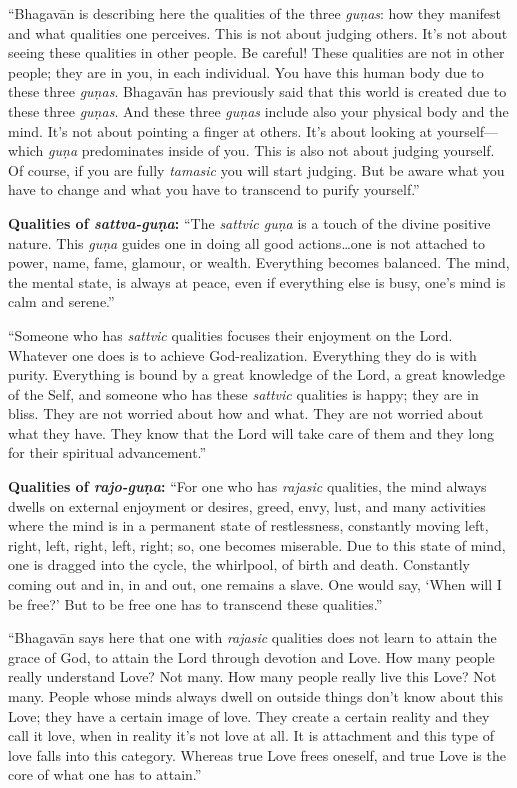 \enquote{Bhagavān is describing here the qualities of the three \textit{guṇas}: how they manifest and what qualities one perceives. This is not about judging others. It’s not about seeing these qualities in other people. Be careful! These qualities are not in other people; they are in you, in each individual. You have this human body due to these three \textit{guṇas}. Bhagavān has previously said that this world is created due to these three \textit{guṇas}. And these three \textit{guṇas} include also your physical body and the mind. It’s not about pointing a finger at others. It’s about looking at yourself---which \textit{guṇa} predominates inside of you. This is also not about judging yourself. Of course, if you are fully \textit{tamasic} you will start judging. But be aware what you have to change and what you have to transcend to purify yourself.}

\textbf{Qualities of \textit{sattva-guṇa}:} \enquote{The \textit{sattvic guṇa} is a touch of the divine positive nature. This \textit{guṇa} guides one in doing all good actions\ldots one is not attached to power, name, fame, glamour, or wealth. Everything becomes balanced. The mind, the mental state, is always at peace, even if everything else is busy, one’s mind is calm and serene.}

\enquote{Someone who has \textit{sattvic} qualities focuses their enjoyment on the Lord. Whatever one does is to achieve God-realization. Everything they do is with purity. Everything is bound by a great knowledge of the Lord, a great knowledge of the Self, and someone who has these \textit{sattvic} qualities is happy; they are in bliss. They are not worried about how and what. They are not worried about what they have. They know that the Lord will take care of them and they long for their spiritual advancement.}

\textbf{Qualities of \textit{rajo-guṇa}:} \enquote{For one who has \textit{rajasic} qualities, the mind always dwells on external enjoyment or desires, greed, envy, lust, and many activities where the mind is in a permanent state of restlessness, constantly moving left, right, left, right, left, right; so, one becomes miserable. Due to this state of mind, one is dragged into the cycle, the whirlpool, of birth and death. Constantly coming out and in, in and out, one remains a slave. One would say, \enquote{When will I be free?} But to be free one has to transcend these qualities.}

\enquote{Bhagavān says here that one with \textit{rajasic} qualities does not learn to attain the grace of God, to attain the Lord through devotion and Love. How many people really understand Love? Not many. How many people really live this Love? Not many. People whose minds always dwell on outside things don’t know about this Love; they have a certain image of love. They create a certain reality and they call it love, when in reality it’s not love at all. It is attachment and this type of love falls into this category. Whereas true Love frees oneself, and true Love is the core of what one has to attain.}

